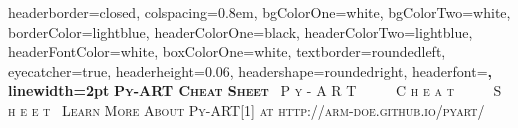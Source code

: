 \documentclass[potrait, z1paper, fontscale=0.33]{baposter} %
\begin{document}
\begin{poster}
{\begin{flushleft}
\begin{tabular}{@{}ll@{}}
\end{tabular}
\end{flushleft}

}

\end{poster}
\newpage


\begin{poster}
{
headerborder=closed, colspacing=0.8em, bgColorOne=white, bgColorTwo=white, borderColor=lightblue, headerColorOne=black, headerColorTwo=lightblue, 
headerFontColor=white, boxColorOne=white, textborder=roundedleft, eyecatcher=true, headerheight=0.06\textheight, headershape=roundedright, headerfont=\Large\bf\textsc, linewidth=2pt 
}
{\bf\textsc{Py-ART Cheat Sheet}\vspace{0.5em}} %
{\textsc{\ P y - A R T \ \ \ \ \ C h e a t \ \ \ \ \ S h e e t\ \hspace{12pt}}}
{\textsc{Learn More About Py-ART[1] at http://arm-doe.github.io/pyart/ \hspace{12pt}}} 


\end{poster}
\end{document}
